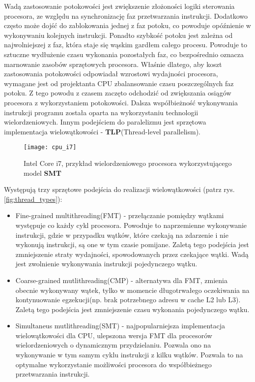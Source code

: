 \documentclass[document.tex]{subfiles}
\begin{document}
Wadą zastosowanie potokowości jest zwiększenie złożoności logiki sterowania procesora, ze względu na synchronizację faz przetwarzania instrukcji. Dodatkowo często może dojść do zablokowania jednej z faz potoku, co powoduje opóźnienie w wykonywaniu kolejnych instrukcji. Ponadto szybkość potoku jest zależna od najwolniejszej z faz, która staje się wąskim gardłem całego procesu. Powoduje to sztuczne wydłużenie czasu wykonania pozostałych faz, co bezpośrednio oznacza marnowanie zasobów sprzętowych procesora. Właśnie dlatego, aby koszt zastosowania 
potokowości odpowiadał wzrostowi wydajności procesora, wymagane jest od projektanta CPU zbalansowanie czasu poszczególnych faz potoku. Z tego powodu z czasem zaczęto odchodzić od zwiększania osiągów procesora z wykorzystaniem potokowości. Dalsza współbieżność wykonywania instrukcji programu została oparta na wykorzystaniu technologii wielordzeniowych.\cite{Inside_Machine}\cite{Computer_Architecture_Patterson_Hennesy} 
\clearpage
\indent Innym podejściem do paralelizmu jest sprzętowa implementacja wielowątkowości - \textbf{TLP}(Thread-level parallelism).
\begin{figure}[h]
\texttt{[image: cpu\_i7]}
\caption{Intel Core i7, przykład wielordzeniowego procesora wykorzystującego model \textbf{SMT} \protect\cite{OS_Stallings}}
\label{fig:cpu_i7}
\end{figure}
Występują trzy sprzętowe podejścia do realizacji wielowątkowości\cite{Computer_Architecture_Patterson_Hennesy}
(patrz rys.\ref{fig:thread_types}):
\begin{itemize}
\item Fine-grained multithreading(FMT) - przełączanie pomiędzy wątkami występuje 
co każdy cykl procesora. Powoduje to naprzemienne wykonywanie instrukcji, gdzie w przypadku wątków, które czekają na zdarzenie i nie wykonują instrukcji, są one w tym czasie pomijane. Zaletą tego podejścia jest zmniejszenie straty wydajności, spowodowanych przez czekające wątki. Wadą jest zwolnienie wykonywania instrukcji pojedynczego wątku.
\item Coarse-grained mutlithreading(CMP) - alternatywa dla FMT, zmienia obecnie wykonywany wątek, tylko w momencie długotrwałego oczekiwania na kontynuowanie egzekucji(np. brak potrzebnego adresu w cache L2 lub L3). Zaletą tego podejścia jest
zmniejszenie czasu wykonania pojedynczego wątku. 
\item Simultaneus mutlithreading(SMT) - najpopularniejsza implementacja wielowątkowości dla CPU, ulepszona wersja FMT dla
procesorów wielordzeniowych o dynamicznym przydzielaniu.
Pozwala ono na wykonywanie w tym samym cyklu instrukcji z kilku
wątków. Pozwala to na optymalne wykorzystanie możliwości procesora do współbieżnego przetwarzania instrukcji.
\end{itemize}
\end{document}
